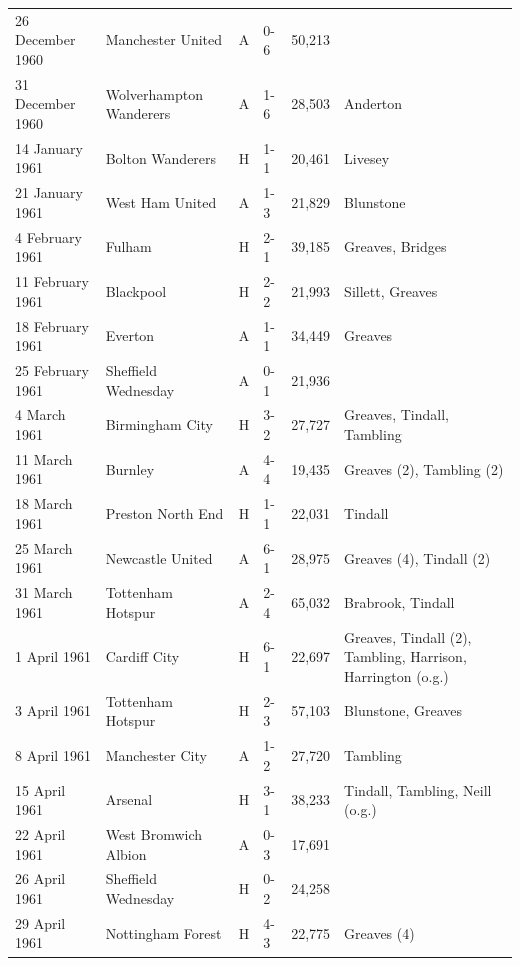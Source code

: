 \documentclass{article}
\begin{document}
\begin{tabular}{llllll}
26 December 1960 & Manchester United & A & 0-6 & 50,213 &  \\
31 December 1960 & Wolverhampton Wanderers & A & 1-6 & 28,503 & Anderton \\
14 January 1961 & Bolton Wanderers & H & 1-1 & 20,461 & Livesey \\
21 January 1961 & West Ham United & A & 1-3 & 21,829 & Blunstone \\
4 February 1961 & Fulham & H & 2-1 & 39,185 & Greaves, Bridges \\
11 February 1961 & Blackpool & H & 2-2 & 21,993 & Sillett, Greaves \\
18 February 1961 & Everton & A & 1-1 & 34,449 & Greaves \\
25 February 1961 & Sheffield Wednesday & A & 0-1 & 21,936 &  \\
4 March 1961 & Birmingham City & H & 3-2 & 27,727 & Greaves, Tindall, Tambling \\
11 March 1961 & Burnley & A & 4-4 & 19,435 & Greaves (2), Tambling (2) \\
18 March 1961 & Preston North End & H & 1-1 & 22,031 & Tindall \\
25 March 1961 & Newcastle United & A & 6-1 & 28,975 & Greaves (4), Tindall (2) \\
31 March 1961 & Tottenham Hotspur & A & 2-4 & 65,032 & Brabrook, Tindall \\
1 April 1961 & Cardiff City & H & 6-1 & 22,697 & Greaves, Tindall (2), Tambling, Harrison, Harrington (o.g.) \\
3 April 1961 & Tottenham Hotspur & H & 2-3 & 57,103 & Blunstone, Greaves \\
8 April 1961 & Manchester City & A & 1-2 & 27,720 & Tambling \\
15 April 1961 & Arsenal & H & 3-1 & 38,233 & Tindall, Tambling, Neill (o.g.) \\
22 April 1961 & West Bromwich Albion & A & 0-3 & 17,691 &  \\
26 April 1961 & Sheffield Wednesday & H & 0-2 & 24,258 &  \\
29 April 1961 & Nottingham Forest & H & 4-3 & 22,775 & Greaves (4) \\
\bottomrule
\end{tabular}
\end{document}
